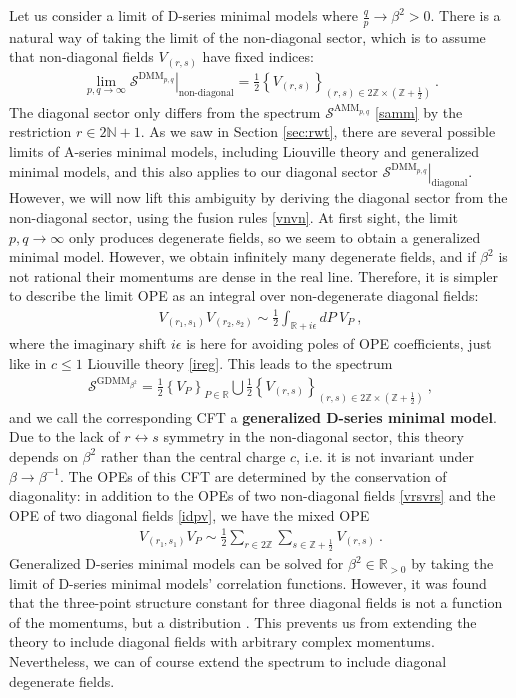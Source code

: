 \documentclass[12pt, a4paper]{article}
\theoremstyle{break}
\begin{document}
Let us consider a limit of D-series minimal models where $\frac{q}{p}\to \beta^2>0$. There is a natural way of taking the limit of the non-diagonal sector, which is to assume that non-diagonal fields $V_{(r,s)}$ have fixed indices:
\begin{align}
 \lim_{p,q\to\infty} \left. \mathcal{S}^{\text{DMM}_{p,q}} \right|_{\text{non-diagonal}} = 
 \frac12\left\{V_{(r,s)} \right\}_{ (r,s)\in 2\mathbb{Z}\times (\mathbb{Z}+\frac12)}\ .
\end{align}
The diagonal sector only differs from the spectrum $\mathcal{S}^{\text{AMM}_{p,q}}$ \eqref{samm} by the restriction $r\in 2\mathbb{N}+1$. 
As we saw in Section \ref{sec:rwt}, there are several possible limits of A-series minimal models, including Liouville theory and generalized minimal models, and this also applies to our diagonal sector $\left. \mathcal{S}^{\text{DMM}_{p,q}} \right|_{\text{diagonal}} $. However, we will now lift this ambiguity by deriving the diagonal sector from the non-diagonal sector, using the fusion rules \eqref{vnvn}. At first sight, the limit $p,q\to \infty$ only produces degenerate fields, so we seem to obtain a generalized minimal model. However, we obtain infinitely many degenerate fields, and 
if $\beta^2$ is not rational their momentums are dense in the real line. Therefore, it is simpler to describe the limit OPE as an integral over non-degenerate diagonal fields:
\begin{align}
 V_{(r_1,s_1)}V_{(r_2,s_2)} \sim \frac12 \int_{\mathbb{R}+i\epsilon} dP\ V_P\ ,
 \label{vrsvrs}
\end{align}
where the imaginary shift $i\epsilon$ is here for avoiding poles of OPE coefficients, just like in $c\leq 1$ Liouville theory \eqref{ireg}. This leads to the spectrum
\begin{align}
\boxed{\mathcal{S}^{\text{GDMM}_{\beta^2}} = \frac12 \left\{V_P\right\}_{P\in \mathbb{R}} \bigcup  \frac12\left\{V_{(r,s)} \right\}_{ (r,s)\in 2\mathbb{Z}\times (\mathbb{Z}+\frac12)}  }\ ,
\end{align}
and we call the corresponding CFT a \textbf{generalized D-series minimal model}. Due to the lack of $r\leftrightarrow s$ symmetry in the non-diagonal sector, this theory depends on $\beta^2$ rather than the central charge $c$, i.e. it is not invariant under $\beta \to \beta^{-1}$. 
The OPEs of this CFT are determined by the conservation of diagonality: in addition to the OPEs of two non-diagonal fields \eqref{vrsvrs} and the OPE of two diagonal fields \eqref{idpv}, we have the mixed OPE 
\begin{align}
 V_{(r_1,s_1)}V_P \sim \frac12 \sum_{r\in 2\mathbb{Z}}\sum_{s\in \mathbb{Z}+\frac12} V_{(r,s)} \ . 
\end{align}
Generalized D-series minimal models can be solved for $\beta^2\in \mathbb{R}_{>0}$ by taking the limit of D-series minimal models' correlation functions. However, it was found that the three-point structure constant for three diagonal fields is not a function of the momentums, but a distribution \cite{rib19}. This prevents us from extending the theory to include diagonal fields with arbitrary complex momentums. Nevertheless, we can of course extend the spectrum to include diagonal degenerate fields. 
\end{document}
